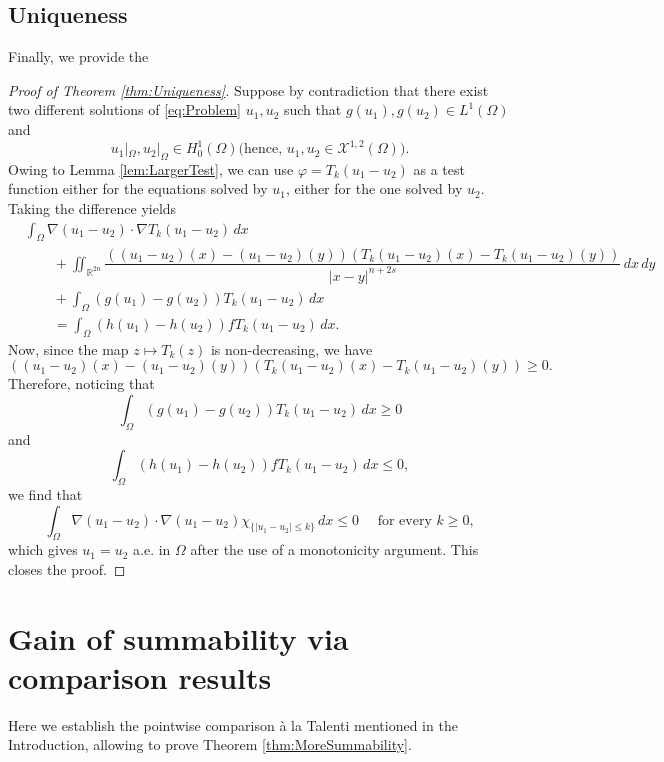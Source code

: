 \documentclass[11pt,a4paper]{amsart}
\theoremstyle{definition}
\theoremstyle{plain}
\numberwithin{equation}{section}
\begin{document}
{\subsection{Uniqueness}
Finally, we provide the  
\begin{proof}[Proof of Theorem \ref{thm:Uniqueness}]
Suppose by contradiction that there exist two different solutions of \eqref{eq:Problem} $u_1, u_2$ such that  $g(u_1), g(u_2)\in L^{1}(\Omega)$ and
$$\text{$u_1|_\Omega,u_2	|_\Omega \in H_0^1(\Omega)$
(hence, $u_1,u_2\in \mathcal{X}^{1,2}(\Omega)$}).$$ 
Owing to Lemma \ref{lem:LargerTest}, we can use 
$\varphi = T_{k}(u_1 - u_2)$ as a test function either for the equations solved by $u_1$, either for the one solved by $u_2$. Taking the difference yields
\begin{equation*}
	\begin{aligned}
			&\int_{\Omega}\nabla(u_1-u_2)\cdot \nabla T_{k}(u_1 - u_2)\,dx \\
			& \qquad + \iint_{\mathbb{R}^{2n}}\dfrac{((u_1-u_2)(x)-(u_1-u_2)(y))(T_{k}(u_1-u_2)(x)-T_{k}(u_1-u_2)(y))}{|x-y|^{n+2s}}\,dx\,dy\\
			&\qquad +\int_{\Omega}(g(u_1)-g(u_2))T_{k}(u_1 - u_2)\,dx \\
			&\qquad = \int_{\Omega}(h(u_1)-h(u_2))f T_{k}(u_1 - u_2)\,dx. 
	\end{aligned}
\end{equation*}
Now, since the map $z\mapsto T_k(z)$ is non-decreasing, we have
\begin{equation*}
((u_1-u_2)(x)-(u_1-u_2)(y))(T_{k}(u_1-u_2)(x)-T_{k}(u_1-u_2)(y))\geq 0.
\end{equation*}
Therefore, noticing that
\begin{equation*}
	\int_{\Omega}(g(u_1)-g(u_2))T_{k}(u_1 - u_2)\,dx \geq 0
\end{equation*}
\noindent and 
\begin{equation*}
	\int_{\Omega}(h(u_1)-h(u_2))f T_{k}(u_1 - u_2)\,dx\leq 0,
\end{equation*}
\noindent we find that
\begin{equation*}
	\int_{\Omega}\nabla(u_1-u_2)\cdot \nabla(u_1 - u_2) \chi_{\{|u_1-u_2|\leq k\}}\,dx \leq 0 \quad \textrm{ for every } k \geq 0,
\end{equation*}
\noindent which gives $u_1 =u_2$ a.e. in $\Omega$ after the use of a monotonicity argument. This closes the proof.
\end{proof}


\section{Gain of summability via comparison results}\label{sec:talenti}
Here we establish the pointwise comparison \`a la Talenti mentioned
in the Introduction, allowing to prove Theorem \ref{thm:MoreSummability}.

}
\end{document}
